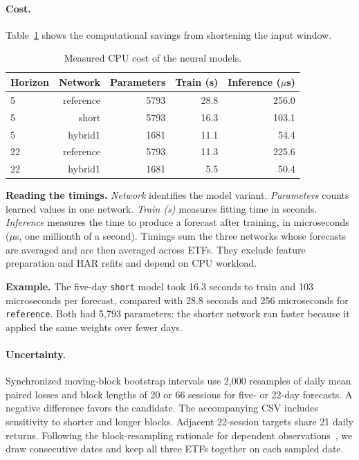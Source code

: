\documentclass[11pt]{article}
\begin{document}
\paragraph{Cost.} Table~\ref{tab:cost} shows the computational savings from shortening the input window.
\begin{table}[htbp]\centering\small\setlength{\tabcolsep}{4pt}\caption{Measured CPU cost of the neural models.}\label{tab:cost}
\begin{tabular}{lrrrr}
\hline
Horizon & Network & Parameters & Train (s) & Inference ($\mu$s) \\
\hline
5 & reference & 5793 & 28.8 & 256.0 \\
5 & short & 5793 & 16.3 & 103.1 \\
5 & hybrid1 & 1681 & 11.1 & 54.4 \\
22 & reference & 5793 & 11.3 & 225.6 \\
22 & hybrid1 & 1681 & 5.5 & 50.4 \\
\hline
\end{tabular}\par\vspace{6pt}\begin{minipage}{.97\linewidth}\small\setlength{\parskip}{4pt}
\textbf{Reading the timings.} \emph{Network} identifies the model variant. \emph{Parameters} counts learned values in one network. \emph{Train (s)} measures fitting time in seconds. \emph{Inference} measures the time to produce a forecast after training, in microseconds ($\mu$s, one millionth of a second). Timings sum the three networks whose forecasts are averaged and are then averaged across ETFs. They exclude feature preparation and HAR refits and depend on CPU workload.

\textbf{Example.} The five-day \texttt{short} model took 16.3 seconds to train and 103 microseconds per forecast, compared with 28.8 seconds and 256 microseconds for \texttt{reference}. Both had 5,793 parameters: the shorter network ran faster because it applied the same weights over fewer days.
\end{minipage}\end{table}
\paragraph{Uncertainty.} Synchronized moving-block bootstrap intervals use 2,000 resamples of daily mean paired losses and block lengths of 20 or 66 sessions for five- or 22-day forecasts. A negative difference favors the candidate. The accompanying CSV includes sensitivity to shorter and longer blocks.
Adjacent 22-session targets share 21 daily returns. Following the block-resampling rationale for dependent observations~\cite{bootstrap}, we draw consecutive dates and keep all three ETFs together on each sampled date.
\end{document}
